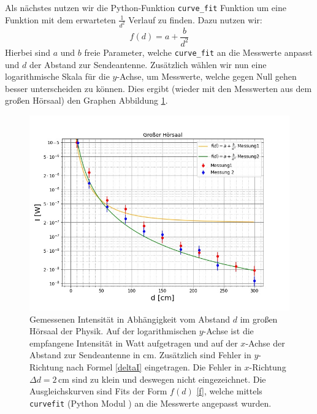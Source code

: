 \documentclass[titlepage,11pt,a4paper,ngerman]{article}
\begin{document}

\noindent
Als nächstes nutzen wir die Python-Funktion \verb|curve_fit| \cite{curvescipy} Funktion um eine Funktion mit dem erwarteten $\frac{1}{d^{2}}$ Verlauf zu finden. Dazu nutzen wir:
\begin{equation}
f(d) = a + \frac{b}{d^{2}}
\label{f}
\end{equation}	
Hierbei sind $a$ und $b$ freie Parameter, welche \verb|curve_fit| an die Messwerte anpasst und $d$ der Abstand zur Sendeantenne. Zusätzlich wählen wir nun eine logarithmische Skala für die $y$-Achse, um Messwerte, welche gegen Null gehen besser unterscheiden zu können. Dies ergibt (wieder mit den Messwerten aus dem großen Hörsaal) den Graphen Abbildung \ref{GrH-A}.

\begin{figure}[ht]
	\includegraphics[scale=0.55]{Bilder/Abstand-GrH.jpg}
	\centering
	\caption{Gemessenen Intensität in Abhängigkeit vom Abstand $d$ im großen Hörsaal der Physik. Auf der logarithmischen $y$-Achse ist die empfangene Intensität in Watt aufgetragen und auf der $x$-Achse der Abstand zur Sendeantenne in cm. Zusätzlich sind Fehler in $y$-Richtung nach Formel \eqref{deltaI} eingetragen. Die Fehler in $x$-Richtung $\Delta d = 2\,$cm sind zu klein und deswegen nicht eingezeichnet. Die Ausgleichskurven sind Fits der Form $f(d)$ \eqref{f}, welche mittels \texttt{curvefit} (Python Modul \cite{curvescipy}) an die Messwerte angepasst wurden.}
	\label{GrH-A}
\end{figure}
\end{document}
